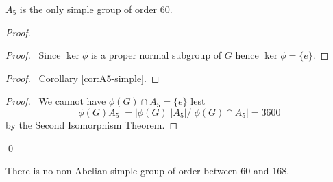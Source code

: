\begin{thm}
$A_5$ is the only simple group of order 60.
\end{thm}

\begin{proof}
\pf
{}
\begin{proof}
	\pf\ Since $\ker \phi$ is a proper normal subgroup of $G$ hence $\ker \phi = \{e\}$.
\end{proof}
\begin{proof}
	\pf\ Corollary \ref{cor:A5-simple}.
\end{proof}
\begin{proof}
	\pf\ We cannot have $\phi(G) \cap A_5 = \{e\}$ lest
	\[ |\phi(G) A_5| = |\phi(G)||A_5| / |\phi(G) \cap A_5| = 3600 \]
	by the Second Isomorphism Theorem.
\end{proof}
\qed
\end{proof}

\begin{prop}
There is no non-Abelian simple group of order between 60 and 168.
\end{prop}

